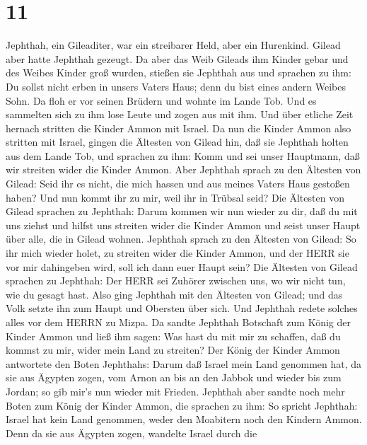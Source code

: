 \hypertarget{section-10}{%
\section{11}\label{section-10}}

 Jephthah, ein Gileaditer, war ein streibarer Held, aber ein
Hurenkind. Gilead aber hatte Jephthah gezeugt.  Da aber das
Weib Gileads ihm Kinder gebar und des Weibes Kinder groß wurden, stießen
sie Jephthah aus und sprachen zu ihm: Du sollst nicht erben in unsers
Vaters Haus; denn du bist eines andern Weibes Sohn.  Da floh
er vor seinen Brüdern und wohnte im Lande Tob. Und es sammelten sich zu
ihm lose Leute und zogen aus mit ihm.  Und über etliche Zeit
hernach stritten die Kinder Ammon mit Israel.  Da nun die
Kinder Ammon also stritten mit Israel, gingen die Ältesten von Gilead
hin, daß sie Jephthah holten aus dem Lande Tob,  und
sprachen zu ihm: Komm und sei unser Hauptmann, daß wir streiten wider
die Kinder Ammon.  Aber Jephthah sprach zu den Ältesten von
Gilead: Seid ihr es nicht, die mich hassen und aus meines Vaters Haus
gestoßen haben? Und nun kommt ihr zu mir, weil ihr in Trübsal seid?
 Die Ältesten von Gilead sprachen zu Jephthah: Darum kommen
wir nun wieder zu dir, daß du mit uns ziehst und hilfst uns streiten
wider die Kinder Ammon und seist unser Haupt über alle, die in Gilead
wohnen.  Jephthah sprach zu den Ältesten von Gilead: So ihr
mich wieder holet, zu streiten wider die Kinder Ammon, und der HERR sie
vor mir dahingeben wird, soll ich dann euer Haupt sein? 
Die Ältesten von Gilead sprachen zu Jephthah: Der HERR sei Zuhörer
zwischen uns, wo wir nicht tun, wie du gesagt hast.  Also
ging Jephthah mit den Ältesten von Gilead; und das Volk setzte ihn zum
Haupt und Obersten über sich. Und Jephthah redete solches alles vor dem
HERRN zu Mizpa.  Da sandte Jephthah Botschaft zum König der
Kinder Ammon und ließ ihm sagen: Was hast du mit mir zu schaffen, daß du
kommst zu mir, wider mein Land zu streiten?  Der König der
Kinder Ammon antwortete den Boten Jephthahs: Darum daß Israel mein Land
genommen hat, da sie aus Ägypten zogen, vom Arnon an bis an den Jabbok
und wieder bis zum Jordan; so gib mir's nun wieder mit Frieden.
 Jephthah aber sandte noch mehr Boten zum König der Kinder
Ammon,  die sprachen zu ihm: So spricht Jephthah: Israel
hat kein Land genommen, weder den Moabitern noch den Kindern Ammon.
 Denn da sie aus Ägypten zogen, wandelte Israel durch die
